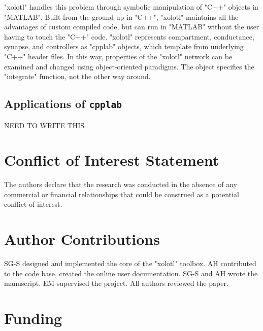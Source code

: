 \documentclass{frontiersSCNS} %
\begin{document}
"xolotl" handles this problem through symbolic manipulation of "C++" objects in "MATLAB". Built from the ground up in "C++", "xolotl" maintains all the advantages of custom compiled code, but can run in "MATLAB" without the user having to touch the "C++" code. "xolotl" represents compartment, conductance, synapse, and controllers as "cpplab" objects, which template from underlying "C++" header files. In this way, properties of the "xolotl" network can be examined and changed using object-oriented paradigms. The object specifies the "integrate" function, not the other way around.

\subsection{Applications of \texttt{cpplab}}

NEED TO WRITE THIS




%
%
%
%
%
%


\section*{Conflict of Interest Statement}

The authors declare that the research was conducted in the absence of any commercial or financial relationships that could be construed as a potential conflict of interest.

\section*{Author Contributions}

SG-S designed and implemented the core of the "xolotl" toolbox. AH contributed to the code base, created the online user documentation. SG-S and AH wrote the manuscript. EM supervised the project. All authors reviewed the paper.

\section*{Funding}
\end{document}
